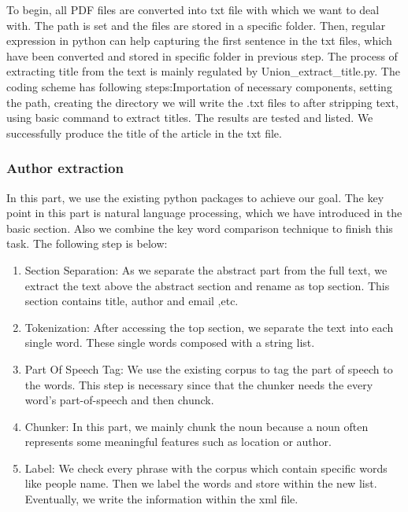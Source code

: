 To begin, all PDF files are converted into txt file with which we want to deal with.
The path is set and the files are stored in a specific folder.
Then, regular expression in python can help capturing the first sentence in the txt files, which have been converted and stored in specific folder in previous step.
The process of extracting title from the text is mainly regulated by Union\_extract\_title.py.
The coding scheme has following steps:Importation of necessary components, setting the path, creating the directory we will write the .txt files to after stripping text, using basic command to extract titles.
The results are tested and listed.
We successfully produce the title of the article in the txt file. 

\subsubsection{Author extraction}

In this part, we use the existing python packages to achieve our goal.
The key point in this part is natural language processing, 
which we have introduced in the basic section.
Also we combine the key word comparison technique to finish this task.
The following step is below:

\begin{enumerate}
	
	\item Section Separation: As we separate the abstract part from the full text, we extract the text above the 
	abstract section and rename as top section. 
	This section contains title, author and email ,etc.
	\item Tokenization: After accessing the top section, we separate the text into each single word. 
	These single words composed with a string list. 
	\item Part Of Speech Tag: We use the existing corpus to tag the part of speech to the words. 
	This step is necessary since that the chunker needs the every word's part-of-speech and then chunck.
	\item Chunker: In this part, we mainly chunk the noun because a noun often represents some meaningful features 
	such as location or author.
	\item Label: We check every phrase with the corpus which contain specific words like people name. 
	Then we label the words and store within the new list. 
	Eventually, we write the information within the xml file. 
	
\end{enumerate}

